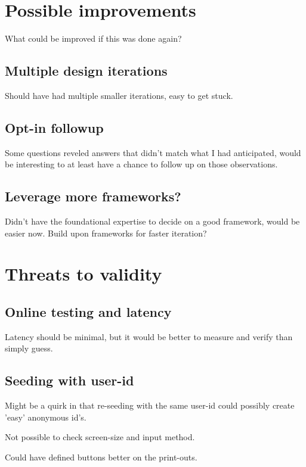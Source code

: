 \section{Possible improvements}

  What could be improved if this was done again?

  \subsection{Multiple design iterations}

    Should have had multiple smaller iterations, easy to get stuck.

  \subsection{Opt-in followup}

    Some questions reveled answers that didn't match what I had
    anticipated, would be interesting to at least have a chance to follow
    up on those observations.

  \subsection{Leverage more frameworks?}

    Didn't have the foundational expertise to decide on a good
    framework, would be easier now.
    Build upon frameworks for faster iteration?

\section{Threats to validity}

  \subsection{Online testing and latency}

  Latency should be minimal, but it would be better to measure and
  verify than simply guess.

  \subsection{Seeding with user-id}

  Might be a quirk in that re-seeding with the same user-id could
  possibly create 'easy' anonymous id's.

  Not possible to check screen-size and input method.

  Could have defined buttons better on the print-outs.

